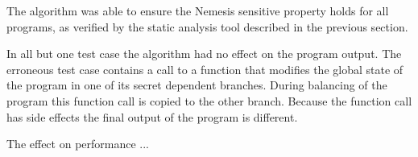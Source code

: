 The algorithm was able to ensure the Nemesis sensitive property holds for all programs, as verified by the static analysis tool described in the previous section. 

In all but one test case the algorithm had no effect on the program output. The erroneous test case contains a call to a function that modifies the global state of the program in one of its secret dependent branches. During balancing of the program this function call is copied to the other branch. Because the function call 
has side effects the final output of the program is different. 

The effect on performance ... 